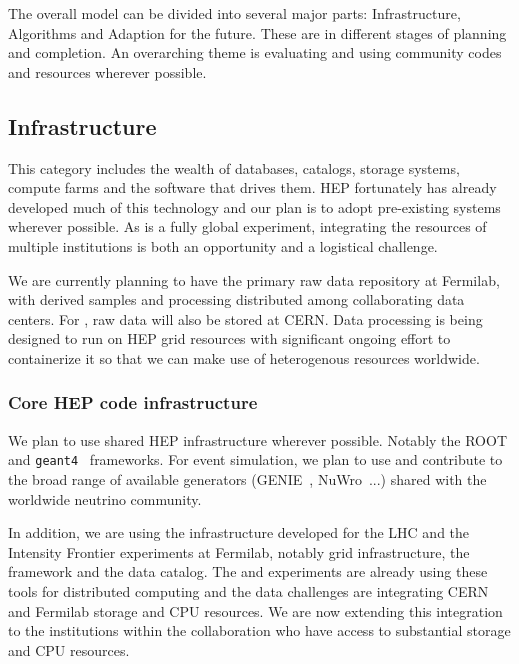 The overall model can be divided into several major parts:  Infrastructure, Algorithms and Adaption for the future.  These are in different stages of planning and completion.  An overarching theme is evaluating and using community codes and resources wherever possible. 



\subsection{Infrastructure}
This category includes the wealth of databases, catalogs, storage systems, compute farms and the software that drives them.  HEP fortunately has already developed much of this technology and our plan is to adopt pre-existing systems wherever possible.  As   is a fully global experiment, integrating the resources of multiple institutions is both an opportunity and a logistical challenge.

We are currently planning to have the primary raw data repository at Fermilab, with derived samples and processing distributed among collaborating data centers.  For , raw data will also be stored at CERN.  Data processing is being designed to run on HEP grid resources with significant ongoing effort to containerize it so that we can make use of heterogenous resources worldwide. 


\subsubsection{Core HEP code infrastructure}
We plan to use shared HEP infrastructure wherever possible.  Notably the ROOT\cite{root} and {\tt geant4}~\cite{geant4,Allison:2006ve} frameworks.   For event simulation, we plan to use and contribute to  the broad range of available generators (GENIE~\cite{Andreopoulos:2009rq}, NuWro~\cite{NuWro2012}...) shared with the worldwide neutrino community.

In addition, we are using the infrastructure developed for the LHC and the Intensity Frontier experiments at Fermilab, notably grid infrastructure,  the  framework and the  data catalog.  The  and  experiments are already using these tools for distributed computing and the  data challenges are integrating CERN and Fermilab storage and CPU resources.  We are now extending this integration to the  institutions within the collaboration who have access to substantial storage and CPU resources. 



